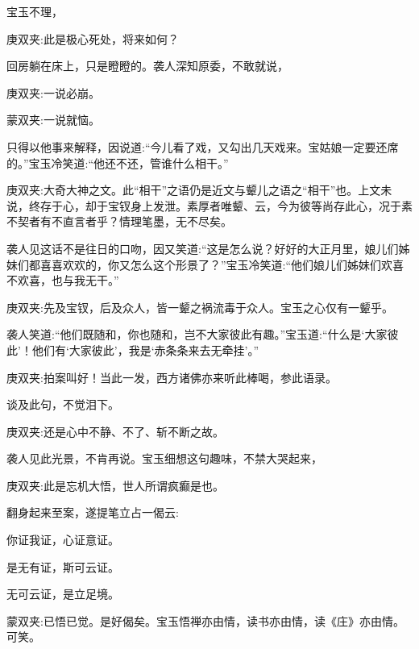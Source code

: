 \begin{parag}
    宝玉不理，\begin{note}庚双夹:此是极心死处，将来如何？\end{note}回房躺在床上，只是瞪瞪的。袭人深知原委，不敢就说，\begin{note}庚双夹:一说必崩。\end{note}\begin{note}蒙双夹:一说就恼。\end{note}只得以他事来解释，因说道:“今儿看了戏，又勾出几天戏来。宝姑娘一定要还席的。”宝玉冷笑道:“他还不还，管谁什么相干。”\begin{note}庚双夹:大奇大神之文。此“相干”之语仍是近文与颦儿之语之“相干”也。上文未说，终存于心，却于宝钗身上发泄。素厚者唯颦、云，今为彼等尚存此心，况于素不契者有不直言者乎？情理笔墨，无不尽矣。\end{note}袭人见这话不是往日的口吻，因又笑道:“这是怎么说？好好的大正月里，娘儿们姊妹们都喜喜欢欢的，你又怎么这个形景了？”宝玉冷笑道:“他们娘儿们姊妹们欢喜不欢喜，也与我无干。”\begin{note}庚双夹:先及宝钗，后及众人，皆一颦之祸流毒于众人。宝玉之心仅有一颦乎。\end{note}袭人笑道:“他们既随和，你也随和，岂不大家彼此有趣。”宝玉道:“什么是‘大家彼此’！他们有‘大家彼此’，我是‘赤条条来去无牵挂’。”\begin{note}庚双夹:拍案叫好！当此一发，西方诸佛亦来听此棒喝，参此语录。\end{note}谈及此句，不觉泪下。\begin{note}庚双夹:还是心中不静、不了、斩不断之故。\end{note}袭人见此光景，不肯再说。宝玉细想这句趣味，不禁大哭起来，\begin{note}庚双夹:此是忘机大悟，世人所谓疯癫是也。\end{note}翻身起来至案，遂提笔立占一偈云:
\end{parag}


\begin{poem}
    \begin{pl}你证我证，心证意证。\end{pl}

    \begin{pl}是无有证，斯可云证。\end{pl}

    \begin{pl}无可云证，是立足境。\end{pl}
    \begin{note}蒙双夹:已悟已觉。是好偈矣。宝玉悟禅亦由情，读书亦由情，读《庄》亦由情。可笑。\end{note}
\end{poem}


